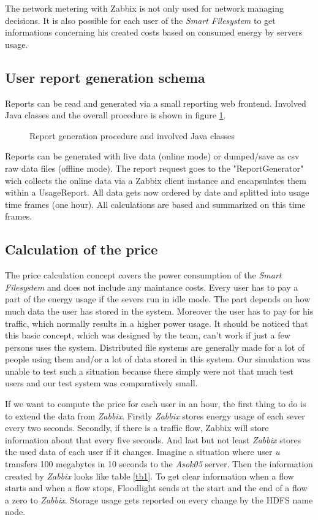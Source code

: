 The network metering with Zabbix is not only used for network managing decisions. It is also possible for each user of the \textit{Smart Filesystem} to get informations concerning his created costs based on consumed energy by servers usage.

\subsection{User report generation schema}
  Reports can be read and generated via a small reporting web frontend. Involved Java classes and the overall procedure is shown in figure \ref{akt}.

 \begin{figure}
 \centering
 
 \caption{Report generation procedure and involved Java classes}
 \label{akt}
 \end{figure}

 Reports can be generated with live data (online mode) or dumped/save as csv raw data files (offline mode). The report request goes to the "ReportGenerator" wich collects the online data via a Zabbix client instance and encapsulates them within a UsageReport. All data gets now ordered by date and splitted into usage time frames (one hour). All calculations are based and summarized on this time frames.
 
 \subsection{Calculation of the price} 
 The price calculation concept covers the power consumption of the \textit{Smart Filesystem} and does not include any maintance costs.
 Every user has to pay a part of the energy usage if the severs run in idle mode. The part depends on how much data the user has stored in the system. Moreover the user has to pay for his traffic, which normally results in a higher power usage. It should be noticed that this basic concept, which was designed by the team, can't work if just a few persons uses the system. Distributed file systems are generally made for a lot of people using them and/or a lot of data stored in this system. Our simulation was unable to test such a situation because there simply were not that much test users and our test system was comparatively small. 
 
 If we want to compute the price for each user in an hour, the first thing to do is to extend the data from \textit{Zabbix}. Firstly \textit{Zabbix} stores energy usage of each sever every two seconds. Secondly, if there is a traffic flow, Zabbix will store information about that every five seconds. And last but not least \textit{Zabbix} stores the used data of each user if it changes. Imagine a situation where user \textit{u} transfers 100 megabytes in 10 seconds to the \textit{Asok05} server. Then the information created by \textit{Zabbix} looks like table \ref{tb1}. 
 To get clear information when a flow starts and when a flow stops, Floodlight sends at the start and the end of a flow a zero to \textit{Zabbix}. Storage usage gets reported on every change by the HDFS name node.

